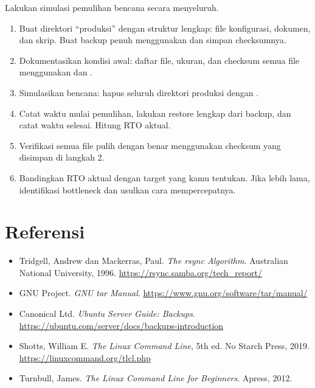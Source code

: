 \begin{exercisebox}
Lakukan simulasi pemulihan bencana secara menyeluruh.
\begin{enumerate}
    \item Buat direktori ``produksi'' dengan struktur lengkap: file konfigurasi,
        dokumen, dan skrip. Buat backup penuh menggunakan  dan simpan
        checksumnya.
    \item Dokumentasikan kondisi awal: daftar file, ukuran, dan checksum semua
        file menggunakan  dan .
    \item Simulasikan bencana: hapus seluruh direktori produksi dengan .
    \item Catat waktu mulai pemulihan, lakukan restore lengkap dari backup, dan
        catat waktu selesai. Hitung RTO aktual.
    \item Verifikasi semua file pulih dengan benar menggunakan checksum yang
        disimpan di langkah 2.
    \item Bandingkan RTO aktual dengan target yang kamu tentukan. Jika lebih lama,
        identifikasi bottleneck dan usulkan cara mempercepatnya.
\end{enumerate}
\end{exercisebox}

\section{Referensi}
\label{sec:backup-references}

\begin{itemize}
    \item Tridgell, Andrew dan Mackerras, Paul. \textit{The rsync Algorithm}.
        Australian National University, 1996.
        \url{https://rsync.samba.org/tech_report/}
    \item GNU Project. \textit{GNU tar Manual}.
        \url{https://www.gnu.org/software/tar/manual/}
    \item Canonical Ltd. \textit{Ubuntu Server Guide: Backups}.
        \url{https://ubuntu.com/server/docs/backups-introduction}
    \item Shotts, William E. \textit{The Linux Command Line}, 5th ed.
        No Starch Press, 2019. \url{https://linuxcommand.org/tlcl.php}
    \item Turnbull, James. \textit{The Linux Command Line for Beginners}.
        Apress, 2012.
\end{itemize}
